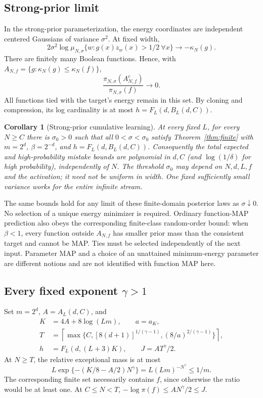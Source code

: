 \documentclass[11pt]{article}
\newtheorem{corollary}[theorem]{Corollary}
\theoremstyle{remark}\newtheorem{remark}[theorem]{Remark}
\begin{document}
\subsection{Strong-prior limit}

In the strong-prior parameterization, the energy coordinates are independent
centered Gaussians of variance $\sigma^2$. At fixed width,
\[
 2\sigma^2\log\mu_{N,\sigma}\{w:g(x)z_w(x)>1/2\ \forall x\}
 \longrightarrow-\kappa_N(g).
\]
There are finitely many Boolean functions. Hence, with
$A_{N,f}=\{g:\kappa_N(g)\le\kappa_N(f)\}$,
\[
 \frac{\pi_{N,\sigma}(A_{N,f}^c)}{\pi_{N,\sigma}(f)}\longrightarrow0.
\]
All functions tied with the target's energy remain in this set. By cloning
and compression, its log cardinality is at most
$h=F_L(d,B_L(d,C))$.

\begin{corollary}[Strong-prior cumulative learning]\label{cor:strong}
At every fixed $L$, for every $N\ge C$ there is $\sigma_0>0$ such that
all $0<\sigma<\sigma_0$ satisfy Theorem~\ref{thm:finite} with
$m=2^d$, $\beta=2^{-d}$, and $h=F_L(d,B_L(d,C))$.
Consequently the total expected and high-probability mistake bounds are
polynomial in $d,C$ (and $\log(1/\delta)$ for high probability), independently
of $N$. The threshold $\sigma_0$ may depend on $N,d,L,f$ and the activation;
it need not be uniform in width. One fixed sufficiently small variance
works for the entire infinite stream.
\end{corollary}

The same bounds hold for any limit of these finite-domain posterior laws
as $\sigma\downarrow0$. No selection of a unique energy minimizer is
required. Ordinary function-MAP prediction also obeys the corresponding
finite-class random-order bound: when $\beta<1$, every function outside
$A_{N,f}$ has smaller prior mass than the consistent target and cannot be
MAP. Ties must be selected independently of the next input. Parameter MAP
and a choice of an unattained minimum-energy parameter are different
notions and are not identified with function MAP here.

\subsection{Every fixed exponent \texorpdfstring{$\gamma>1$}{gamma > 1}}

Set $m=2^d$, $A=A_L(d,C)$, and
\begin{align*}
 K&=4A+8\log(Lm),\qquad a=a_K,\\
 T&=\left\lceil\max\{C,[8(d+1)]^{1/(\gamma-1)},
                         (8/a)^{2/(\gamma-1)}\}\right\rceil,\\
 h&=F_L(d,(L+3)K),\qquad J=AT^\gamma/2.
\end{align*}
At $N\ge T$, the relative exceptional mass is at most
\[
 L\exp\{-(K/8-A/2)N^\gamma\}
 =L(Lm)^{-N^\gamma}\le1/m.
\]
The corresponding finite set necessarily contains $f$, since otherwise
the ratio would be at least one. At $C\le N<T$,
$-\log\pi(f)\le AN^\gamma/2\le J$.
\end{document}
